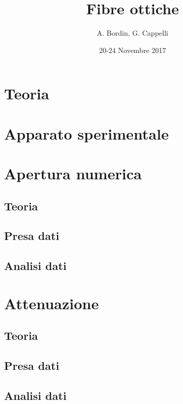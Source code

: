 \documentclass[a4paper]{article}
\author{A. Bordin, G. Cappelli}
\title{Fibre ottiche}
\date{20-24 Novembre 2017}
\begin{document}
	\maketitle
	
	\begin{abstract}
		 
	\end{abstract}
	
\section{Teoria}

\section{Apparato sperimentale}

\section{Apertura numerica}

\subsection{Teoria}

\subsection{Presa dati}

\subsection{Analisi dati}

\section{Attenuazione}

\subsection{Teoria}

\subsection{Presa dati}

\subsection{Analisi dati}
\end{document}
